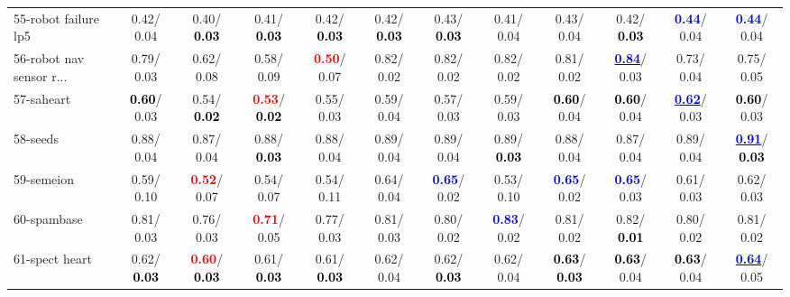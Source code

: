 \begin{table}[h]
\begin{center}
{\begin{tabular}{lc|c|c|c|c|c|c|c|c|c|c}
55-robot failure lp5 &   0.42/  0.04 &   0.40/\textcolor{black}{\textbf{  0.03}} &   0.41/\textcolor{black}{\textbf{  0.03}} &   0.42/\textcolor{black}{\textbf{  0.03}} &   0.42/\textcolor{black}{\textbf{  0.03}} &   0.43/\textcolor{black}{\textbf{  0.03}} &   0.41/  0.04 &   0.43/  0.04 &   0.42/\textcolor{black}{\textbf{  0.03}} & \textcolor{blue}{\textbf{  0.44}}/  0.04 & \textcolor{blue}{\textbf{  0.44}}/  0.04 \\
56-robot nav sensor r... &   0.79/  0.03 &   0.62/  0.08 &   0.58/  0.09 & \textcolor{red}{\textbf{  0.50}}/  0.07 &   0.82/  0.02 &   0.82/  0.02 &   0.82/  0.02 &   0.81/  0.02 & \underline{\textcolor{blue}{\textbf{  0.84}}}/  0.03 &   0.73/  0.04 &   0.75/  0.05 \\
57-saheart & \textcolor{black}{\textbf{  0.60}}/  0.03 &   0.54/\textcolor{black}{\textbf{  0.02}} & \textcolor{red}{\textbf{  0.53}}/\textcolor{black}{\textbf{  0.02}} &   0.55/  0.03 &   0.59/  0.04 &   0.57/  0.03 &   0.59/  0.03 & \textcolor{black}{\textbf{  0.60}}/  0.04 & \textcolor{black}{\textbf{  0.60}}/  0.04 & \underline{\textcolor{blue}{\textbf{  0.62}}}/  0.03 & \textcolor{black}{\textbf{  0.60}}/  0.03 \\
58-seeds &   0.88/  0.04 &   0.87/  0.04 &   0.88/\textcolor{black}{\textbf{  0.03}} &   0.88/  0.04 &   0.89/  0.04 &   0.89/  0.04 &   0.89/\textcolor{black}{\textbf{  0.03}} &   0.88/  0.04 &   0.87/  0.04 &   0.89/  0.04 & \underline{\textcolor{blue}{\textbf{  0.91}}}/\textcolor{black}{\textbf{  0.03}} \\
59-semeion &   0.59/  0.10 & \textcolor{red}{\textbf{  0.52}}/  0.07 &   0.54/  0.07 &   0.54/  0.11 &   0.64/  0.04 & \textcolor{blue}{\textbf{  0.65}}/  0.02 &   0.53/  0.10 & \textcolor{blue}{\textbf{  0.65}}/  0.02 & \textcolor{blue}{\textbf{  0.65}}/  0.03 &   0.61/  0.03 &   0.62/  0.03 \\
60-spambase &   0.81/  0.03 &   0.76/  0.03 & \textcolor{red}{\textbf{  0.71}}/  0.05 &   0.77/  0.03 &   0.81/  0.03 &   0.80/  0.02 & \textcolor{blue}{\textbf{  0.83}}/  0.02 &   0.81/  0.02 &   0.82/\textcolor{black}{\textbf{  0.01}} &   0.80/  0.02 &   0.81/  0.02 \\ \hline
61-spect heart &   0.62/\textcolor{black}{\textbf{  0.03}} & \textcolor{red}{\textbf{  0.60}}/\textcolor{black}{\textbf{  0.03}} &   0.61/\textcolor{black}{\textbf{  0.03}} &   0.61/\textcolor{black}{\textbf{  0.03}} &   0.62/  0.04 &   0.62/\textcolor{black}{\textbf{  0.03}} &   0.62/  0.04 & \textcolor{black}{\textbf{  0.63}}/\textcolor{black}{\textbf{  0.03}} & \textcolor{black}{\textbf{  0.63}}/  0.04 & \textcolor{black}{\textbf{  0.63}}/  0.04 & \underline{\textcolor{blue}{\textbf{  0.64}}}/  0.05 \\

\end{tabular}}
\end{center}
\end{table}
